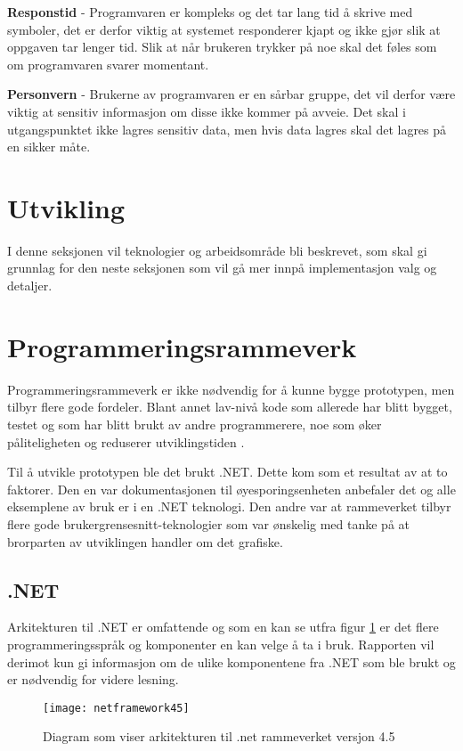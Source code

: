  \textbf{Responstid} -  Programvaren er kompleks og det tar lang tid å skrive med symboler, det er derfor viktig at systemet responderer kjapt og ikke gjør slik at oppgaven tar lenger tid. Slik at når brukeren trykker på noe skal det føles som om programvaren svarer momentant. 

\textbf{Personvern} - Brukerne av programvaren er en sårbar gruppe, det vil derfor være viktig at sensitiv informasjon om disse ikke kommer på avveie. Det skal i utgangspunktet ikke lagres sensitiv data, men hvis data lagres skal det lagres på en sikker måte. 
 
\section{Utvikling} 
 
I denne seksjonen vil teknologier og arbeidsområde bli beskrevet, som skal gi grunnlag for den neste seksjonen som vil gå mer innpå implementasjon valg og detaljer. 
 
 
\section{Programmeringsrammeverk} 

Programmeringsrammeverk er ikke nødvendig for å kunne bygge prototypen, men tilbyr flere gode fordeler. Blant annet lav-nivå kode som allerede har blitt bygget, testet og som har blitt brukt av andre programmerere, noe som øker påliteligheten og reduserer utviklingstiden \cite{Frame7:online}.

Til å utvikle prototypen ble det brukt .NET. Dette kom som et resultat av at
to faktorer. Den en var dokumentasjonen til øyesporingsenheten anbefaler det og alle eksemplene av bruk er i en .NET teknologi. Den andre var at rammeverket tilbyr flere gode brukergrensesnitt-teknologier som var ønskelig med tanke på at brorparten av utviklingen handler om det grafiske.


\subsection{.NET}
 
Arkitekturen til .NET er omfattende og som en kan se utfra figur \ref{fig:net-arkitektur} er det flere programmeringsspråk og komponenter en kan velge å ta i bruk. Rapporten vil derimot kun gi informasjon om de ulike komponentene fra .NET som ble brukt og er nødvendig for videre lesning. 
 
 
\begin{figure}[ht] 
\centering 
\texttt{[image: netframework45]} 
\caption{Diagram som viser arkitekturen til .net rammeverket versjon 4.5} 
\label{fig:net-arkitektur} 
\end{figure} 
 
